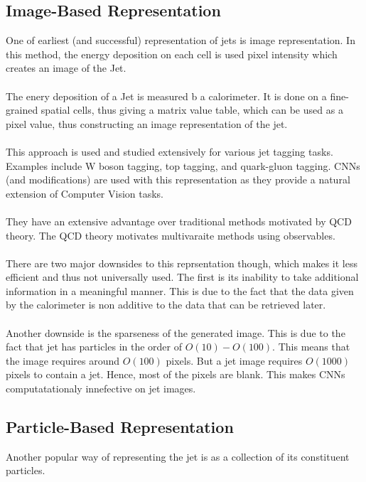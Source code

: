 \subsection{Image-Based Representation}
One of earliest (and successful) representation of jets is image representation. 
In this method, the energy deposition on each cell is used pixel intensity 
which creates an image of the Jet.
\\\\
The enery deposition of a Jet is measured b a calorimeter. It is done on a 
fine-grained spatial cells, thus giving a matrix value table, which can be 
used as a pixel value, thus constructing an image representation of the jet.
\\\\
This approach is used and studied extensively for various jet tagging tasks.
Examples include W boson tagging, top tagging, and quark-gluon tagging. 
CNNs (and modifications) are used with this representation as they 
provide a natural extension of Computer Vision tasks.
\\\\
They have an extensive advantage over traditional methods motivated by QCD 
theory. The QCD theory motivates multivaraite methods using observables. 
\\\\
There are two major downsides to this reprsentation though, which makes it 
less efficient and thus not universally used. The first is its inability 
to take additional information in a meaningful manner. This is due to 
the fact that the data given by the calorimeter is non additive to the 
data that can be retrieved later.
\\\\
Another downside is the sparseness of the generated image. This is due to the 
fact that jet has particles in the order of $O(10) - O(100)$. This means 
that the image requires around $O(100)$ pixels. But a jet image requires 
$O(1000)$ pixels to contain a jet. Hence, most of the pixels are blank. This 
makes CNNs computatationaly innefective on jet images.

\subsection{Particle-Based Representation}
Another popular way of representing the jet is as a collection of its 
constituent particles. 

